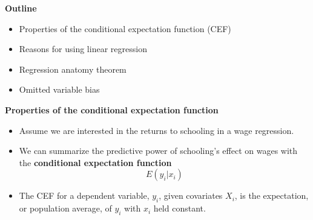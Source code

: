 \documentclass[notes=show]{beamer}
\begin{document}
\begin{frame}[plain]

\begin{center}
\textbf{Outline}
\end{center}

\begin{itemize}
\item Properties of the conditional expectation function (CEF)
\item Reasons for using linear regression
\item Regression anatomy theorem
\item Omitted variable bias
\end{itemize}
\end{frame}


\begin{frame}[plain]
	\begin{center}
	\textbf{Properties of the conditional expectation function}
	\end{center}
	
	\begin{itemize}
	\item Assume we are interested in the returns to schooling in a wage regression. 
	\item We can summarize the predictive power of schooling's effect on wages with the \textbf{conditional expectation function}
	\begin{equation}
	E(y_i|x_i)
	\end{equation}
	\item The CEF for a dependent variable, $y_i$, given covariates $X_i$, is the expectation, or population average, of $y_i$ with $x_i$ held constant.
	\end{itemize}
\end{frame}
\end{document}
